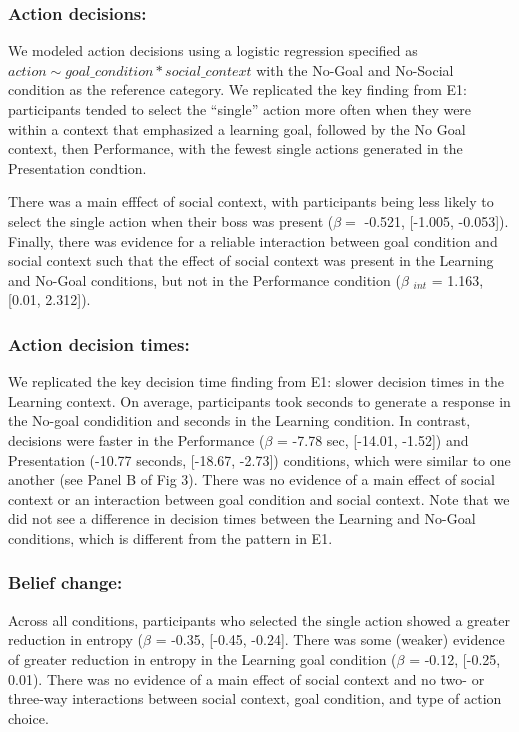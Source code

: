 \documentclass[10pt, letterpaper]{article}
\begin{document}
\subsubsection{Action decisions:}\label{action-decisions-1}

We modeled action decisions using a logistic regression specified as
\texttt{$action \sim goal\_condition * social\_context$} with the
No-Goal and No-Social condition as the reference category. We replicated
the key finding from E1: participants tended to select the ``single''
action more often when they were within a context that emphasized a
learning goal, followed by the No Goal context, then Performance, with
the fewest single actions generated in the Presentation condtion.

There was a main efffect of social context, with participants being less
likely to select the single action when their boss was present
(\(\beta =\) -0.521, {[}-1.005, -0.053{]}). Finally, there was evidence
for a reliable interaction between goal condition and social context
such that the effect of social context was present in the Learning and
No-Goal conditions, but not in the Performance condition (\(\beta\)
\(_{int}\) = 1.163, {[}0.01, 2.312{]}).

\subsubsection{Action decision times:}\label{action-decision-times-1}

We replicated the key decision time finding from E1: slower decision
times in the Learning context. On average, participants took seconds to
generate a response in the No-goal condidition and seconds in the
Learning condition. In contrast, decisions were faster in the
Performance (\(\beta\) = -7.78 sec, {[}-14.01, -1.52{]}) and
Presentation (-10.77 seconds, {[}-18.67, -2.73{]}) conditions, which
were similar to one another (see Panel B of Fig 3). There was no
evidence of a main effect of social context or an interaction between
goal condition and social context. Note that we did not see a difference
in decision times between the Learning and No-Goal conditions, which is
different from the pattern in E1.

\subsubsection{Belief change:}\label{belief-change-1}

Across all conditions, participants who selected the single action
showed a greater reduction in entropy (\(\beta\) = -0.35, {[}-0.45,
-0.24{]}. There was some (weaker) evidence of greater reduction in
entropy in the Learning goal condition (\(\beta\) = -0.12, {[}-0.25,
0.01). There was no evidence of a main effect of social context and no
two- or three-way interactions between social context, goal condition,
and type of action choice.
\end{document}
